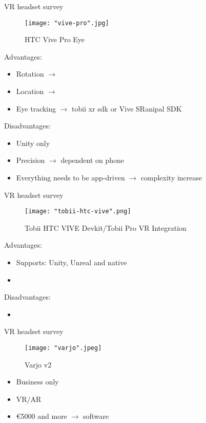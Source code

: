 \documentclass{beamer}
\begin{document}
\begin{frame}{VR headset survey}
	\begin{figure}
		\texttt{[image: "vive-pro".jpg]}
		\caption{HTC Vive Pro Eye}
	\end{figure}
	
	Advantages:
	\begin{itemize}
		\item Rotation $\rightarrow$
		\item Location $\rightarrow$ 
		\item Eye tracking $\rightarrow$ tobii xr sdk or Vive SRanipal SDK
	\end{itemize}
	
	Disadvantages:
	\begin{itemize}
		\item Unity only
		\item Precision $\rightarrow$ dependent on phone
		\item Everything needs to be app-driven $\rightarrow$ complexity increase
	\end{itemize}
\end{frame}



\begin{frame}{VR headset survey}
	\begin{figure}
		\texttt{[image: "tobii-htc-vive".png]}
		\caption{Tobii HTC VIVE Devkit/Tobii Pro VR Integration}
	\end{figure}
	
	Advantages:
	\begin{itemize}
		\item Supports: Unity, Unreal and native 
		\item 
	\end{itemize}
	
	Disadvantages:
	\begin{itemize}
		\item 
	\end{itemize}
\end{frame}


\begin{frame}{VR headset survey}
	\begin{figure}
		\texttt{[image: "varjo".jpeg]}
		\caption{Varjo v2}
	\end{figure}
	

	\begin{itemize}
		\item Business only
		\item VR/AR
		\item €5000 and more $\rightarrow$ software
	\end{itemize}
\end{frame}
\end{document}
